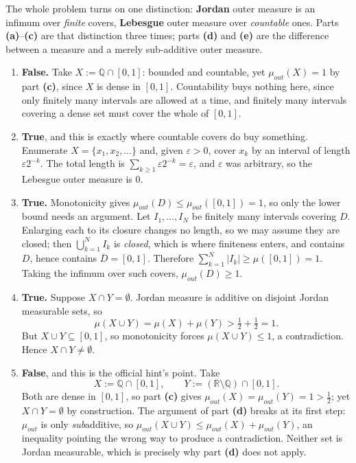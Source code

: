 \begin{exercisesolution}
\label{sol:jordan_measure_properties_tf}
The whole problem turns on one distinction: \textbf{Jordan} outer measure is an infimum over
\emph{finite} covers, \textbf{Lebesgue} outer measure over \emph{countable} ones. Parts
\textbf{(a)}--\textbf{(c)} are that distinction three times; parts \textbf{(d)} and \textbf{(e)}
are the difference between a measure and a merely sub-additive outer measure.
\begin{enumerate}[label=\textbf{(\alph*)}]
  \item \textbf{False.} Take $X := \mathbb{Q}\cap[0,1]$: bounded and countable, yet
    $\mu_{out}(X) = 1$ by part \textbf{(c)}, since $X$ is dense in $[0,1]$. Countability buys
    nothing here, since only finitely many intervals are allowed at a time, and finitely many
    intervals covering a dense set must cover the whole of $[0,1]$.
  \item \textbf{True}, and this is exactly where countable covers do buy something. Enumerate
    $X = \{x_1,x_2,\dots\}$ and, given $\varepsilon > 0$, cover $x_k$ by an interval of length
    $\varepsilon 2^{-k}$. The total length is $\sum_{k\geq1}\varepsilon2^{-k} = \varepsilon$, and
    $\varepsilon$ was arbitrary, so the Lebesgue outer measure is $0$.
  \item \textbf{True.} Monotonicity gives $\mu_{out}(D) \leq \mu_{out}([0,1]) = 1$, so only the
    lower bound needs an argument. Let $I_1,\dots,I_N$ be finitely many intervals covering $D$.
    Enlarging each to its closure changes no length, so we may assume they are closed; then
    $\bigcup_{k=1}^N I_k$ is \emph{closed}, which is where finiteness enters, and contains
    $D$, hence contains $\overline D = [0,1]$. Therefore
    $\sum_{k=1}^N |I_k| \geq \mu([0,1]) = 1$. Taking the infimum over such covers,
    $\mu_{out}(D) \geq 1$.
  \item \textbf{True.} Suppose $X \cap Y = \emptyset$. Jordan measure is additive on disjoint
    Jordan measurable sets, so
    \[\mu(X \cup Y) = \mu(X) + \mu(Y) > \tfrac12 + \tfrac12 = 1.\]
    But $X \cup Y \subseteq [0,1]$, so monotonicity forces $\mu(X\cup Y) \leq 1$, a
    contradiction. Hence $X \cap Y \neq \emptyset$.
  \item \textbf{False}, and this is the official hint's point. Take
    \[X := \mathbb{Q}\cap[0,1], \qquad Y := (\mathbb{R}\setminus\mathbb{Q})\cap[0,1].\]
    Both are dense in $[0,1]$, so part \textbf{(c)} gives $\mu_{out}(X) = \mu_{out}(Y) = 1 >
    \tfrac12$; yet $X \cap Y = \emptyset$ by construction. The argument of part \textbf{(d)}
    breaks at its first step:
    $\mu_{out}$ is only \emph{sub}additive, so $\mu_{out}(X\cup Y) \leq \mu_{out}(X)+\mu_{out}(Y)$,
    an inequality pointing the wrong way to produce a contradiction. Neither set is Jordan
    measurable, which is precisely why part \textbf{(d)} does not apply.
\end{enumerate}


\end{exercisesolution}
